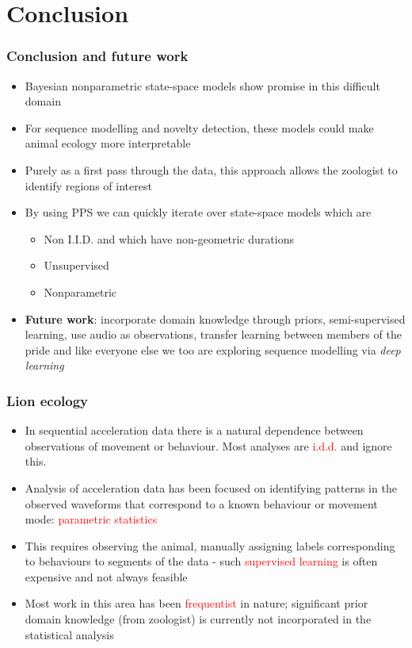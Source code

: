 \documentclass[aspectratio=169]{beamer}
\begin{document}
\section{Conclusion}
\begin{frame}
    \frametitle{Conclusion and future work}
    \begin{itemize}
        \item Bayesian nonparametric state-space models show promise in this difficult domain 
        \item For sequence modelling and novelty detection, these models could make animal ecology more interpretable
        \item Purely as a first pass through the data, this approach allows the zoologist to identify regions of interest
        \item By using PPS we can quickly iterate over state-space models which are 
            \begin{itemize}
                \item Non I.I.D.  and which have non-geometric durations
                \item Unsupervised
                \item Nonparametric
            \end{itemize}
        \item {\bf Future work}: incorporate domain knowledge through priors, semi-supervised learning, use audio as observations, transfer learning between members of the pride and like everyone else we too are exploring sequence modelling via \emph{deep learning} 
    \end{itemize}
\end{frame}


\iffalse %
\begin{frame}
    \frametitle{Lion ecology}

    \begin{itemize}
        \item In sequential acceleration data there is a natural dependence between observations of movement or behaviour. Most analyses are \textcolor{red}{i.d.d.} and ignore this.
        \item Analysis of acceleration data
            has been focused on identifying patterns in the observed waveforms that correspond to a known behaviour or movement mode: \textcolor{red}{parametric statistics}
        \item This requires observing the animal, manually assigning labels corresponding to behaviours to segments of the data - such \textcolor{red}{supervised learning} is often expensive and not always feasible
        \item Most work in this area has been \textcolor{red}{frequentist} in nature; significant prior domain knowledge (from zoologist) is currently not incorporated in the statistical analysis
    \end{itemize}

\end{frame}
\end{document}
